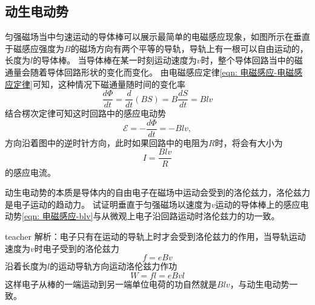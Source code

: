 \subsection{动生电动势}
匀强磁场当中匀速运动的导体棒可以展示最简单的电磁感应现象，如图所示在垂直于磁感应强度为$B$的磁场方向有两个平等的导轨，导轨上有一根可以自由运动的，长度为$l$的导体棒。
当导体棒在某一时刻运动速度为$v$时，整个导体回路当中的磁通量会随着导体回路形状的变化而变化。
由电磁感应定律\ref{eqn: 电磁感应-电磁感应定律}可知，这种情况下磁通量随时间的变化率
\begin{equation}
\frac{d\Phi}{dt} = \frac{d}{dt}(BS) = B\frac{dS}{dt} = Blv
\end{equation}
结合楞次定律可知这时回路中的感应电动势
\begin{equation}\label{eqn: 电磁感应-blv}
\mathcal{E} = -\frac{d\Phi}{dt} = -Blv,
\end{equation}
方向沿着图中的逆时针方向，此时如果回路中的电阻为$R$时，将会有大小为
\begin{equation}
I=\frac{Blv}{R}
\end{equation}
的感应电流。



\begin{example}
动生电动势的本质是导体内的自由电子在磁场中运动会受到的洛伦兹力，洛伦兹力是电子运动的趋动力。
试证明垂直于匀强磁场以速度为$v$运动的导体棒上的感应电动势\ref{eqn: 电磁感应-blv}与从微观上电子沿回路运动时洛伦兹力的功一致。
\begin{taggedblock}{teacher}
\newline
解析：电子只有在运动的导轨上时才会受到洛伦兹力的作用，当导轨运动速度为$v$时电子受到的洛伦兹力
\[f=eBv\]
沿着长度为$l$的运动导轨方向运动洛伦兹力作功
\[W = fl =eBvl\]
这样电子从棒的一端运动到另一端单位电荷的功自然就是$Blv$，与动生电动势一致。
\end{taggedblock}
\end{example}

